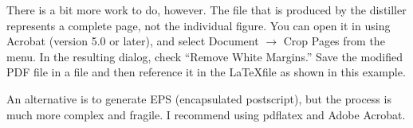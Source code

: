 \documentclass[10pt,twocolumn]{article}
\begin{document}
There is a bit more work to do, however.
The file that is produced by the distiller represents
a complete page, not the individual figure.
You can open it in using Acrobat (version 5.0 or later),
and select Document $\rightarrow$ Crop Pages from the menu.
In the resulting dialog, check ``Remove White Margins.''
Save the modified PDF file in a file and then reference
it in the \LaTeX file as shown in this example.

An alternative is to generate EPS (encapsulated postscript),
but the process is much more complex and fragile.
I recommend using pdflatex and Adobe Acrobat.



\end{document}
